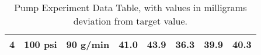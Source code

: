 \begin{sidewaystable}[]
\begin{tabular}{lcc|r|r|r|r|r}
\multicolumn{1}{|l|}{4}                                                            & \multicolumn{1}{c|}{100 psi}                                                            & 90 g/min             & 41.0                            & 43.9                            & 36.3                            & 39.9                            & \multicolumn{1}{r|}{40.3}                                                              \\ \hline
\end{tabular}\caption{Pump Experiment Data Table, with values in milligrams deviation from target value.}\label{RouterData}
\end{sidewaystable}
